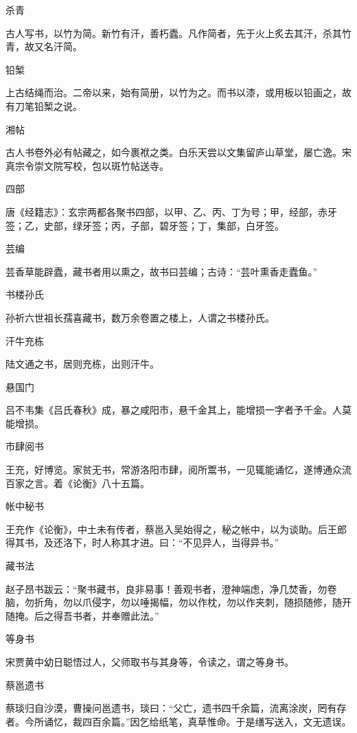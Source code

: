 \documentclass[a4paper,12pt,UTF8,twoside]{ctexbook}
\begin{document}
    杀青
    
    古人写书，以竹为简。新竹有汗，善朽蠹。凡作简者，先于火上炙去其汗，杀其竹青，故又名汗简。
    
    铅椠
    
    上古结绳而治。二帝以来，始有简册，以竹为之。而书以漆，或用板以铅画之，故有刀笔铅椠之说。
    
    湘帖
    
    古人书卷外必有帖藏之，如今裹袱之类。白乐天尝以文集留庐山草堂，屡亡逸。宋真宗令崇文院写校，包以斑竹帖送寺。
    
    四部
    
    唐《经籍志》：玄宗两都各聚书四部，以甲、乙、丙、丁为号；甲，经部，赤牙签；乙，史部，绿牙签；丙，子部，碧牙签；丁，集部，白牙签。
    
    芸编
    
    芸香草能辟蠹，藏书者用以熏之，故书曰芸编；古诗：“芸叶熏香走蠹鱼。”
    
    书楼孙氏
    
    孙祈六世祖长孺喜藏书，数万余卷置之楼上，人谓之书楼孙氏。
    
    汗牛充栋
    
    陆文通之书，居则充栋，出则汗牛。
    
    悬国门
    
    吕不韦集《吕氏春秋》成，暴之咸阳市，悬千金其上，能增损一字者予千金。人莫能增损。
    
    市肆阅书
    
    王充，好博览。家贫无书，常游洛阳市肆，阅所鬻书，一见辄能诵忆，遂博通众流百家之言。着《论衡》八十五篇。
    
    帐中秘书
    
    王充作《论衡》，中土未有传者，蔡邕入吴始得之，秘之帐中，以为谈助。后王郎得其书，及还洛下，时人称其才进。曰：“不见异人，当得异书。”
    
    藏书法
    
    赵子昂书跋云：“聚书藏书，良非易事！善观书者，澄神端虑，净几焚香，勿卷脑，勿折角，勿以爪侵字，勿以唾揭幅，勿以作枕，勿以作夹刺，随损随修，随开随掩。后之得吾书者，并奉赠此法。”
    
    等身书
    
    宋贾黄中幼日聪悟过人，父师取书与其身等，令读之，谓之等身书。
    
    蔡邕遗书
    
    蔡琰归自沙漠，曹操问邕遗书，琰曰：“父亡，遗书四千余篇，流离涂炭，罔有存者。今所诵忆，裁四百余篇。”因乞给纸笔，真草惟命。于是缮写送入，文无遗误。
    
\end{document}
